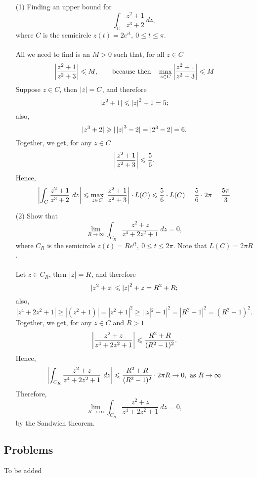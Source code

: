 \begin{example}\hfill
\begin{itemize}
\item[(1)] Finding an upper bound for
\[\int_C\frac{z^2 + 1}{z^3 + 2}\ dz,\]
where $C$ is the semicircle $z(t) = 2e^{it},\ 0 \leq t \leq \pi$.\\
\\
All we need to find is an $M > 0$ such that, for all $z \in C$
\[\left\lvert\frac{z^2 + 1}{z^2 + 3}\right\rvert \leqslant M,\qquad \text{because then}\quad\max_{z \in C}\left\lvert\frac{z^2 + 1}{z^2 + 3}\right\rvert \leqslant M\]
Suppose $z \in C$, then $\left\lvert z\right\rvert = C$, and therefore
\[|z^2 + 1| \leqslant \left\lvert z\right\rvert^2 + 1 = 5;\]
also,
\[|z^3 + 2| \geqslant |\left\lvert z\right\rvert^3 - 2| = |2^3 - 2| = 6.\]
Together, we get, for any $z \in C$
\[\left\lvert\frac{z^2 + 1}{z^2 + 3}\right\rvert \leqslant \frac{5}{6}.\]
Hence, 
\[\left\lvert\int_C\frac{z^2 + 1}{z^3 + 2}\ dz\right\rvert \leqslant \max_{z \in C}\left\lvert\frac{z^2 + 1}{z^2 + 3}\right\rvert\cdot L(C) \leqslant \frac{5}{6}\cdot L(C) = \frac{5}{6}\cdot 2\pi = \frac{5\pi}{3}\]

\item[(2)] Show that
\[\lim_{R \to \infty}\int_{C_R}\frac{z^2 + z}{z^4 + 2z^2 + 1}\ dz = 0,\]
where $C_R$ is the semicircle $z(t) = Re^{it},\ 0 \leq t \leq 2\pi$. Note that $L(C) = 2\pi R$.\\
\\
Let $z \in C_R$, then $\left\lvert z\right\rvert = R$, and therefore
\[|z^2 + z| \leqslant \left\lvert z\right\rvert^2 + z = R^2 + R;\]
also,
\[|z^4 + 2z^2 + 1| \geq |(z^2 + 1)| = |z^2 + 1|^2 \geq ||z|^2 - 1|^2 = |R^2 - 1|^2 = (R^2 - 1)^2.\]
Together, we get, for any $z \in C$ and $R > 1$
\[\left\lvert\frac{z^2 + z}{z^4 + 2z^2 + 1}\right\rvert \leqslant \frac{R^2 + R}{(R^2 - 1)^2}.\]
Hence, 
\[\abs{\int_{C_R}\frac{z^2 + z}{z^4 + 2z^2 + 1}\ dz} \leq \frac{R^2 + R}{(R^2 - 1)^2}\cdot 2\pi R  \to 0,\ \text{as } R \to \infty\]
Therefore,
\[\lim_{R \to \infty}\int_{C_R}\frac{z^2 + z}{z^4 + 2z^2 + 1}\ dz = 0,\]
by the Sandwich theorem.
\end{itemize}
\end{example}

\vspace*{2em}

\subsection{Problems}
\vspace{0.1in}
To be added
%
